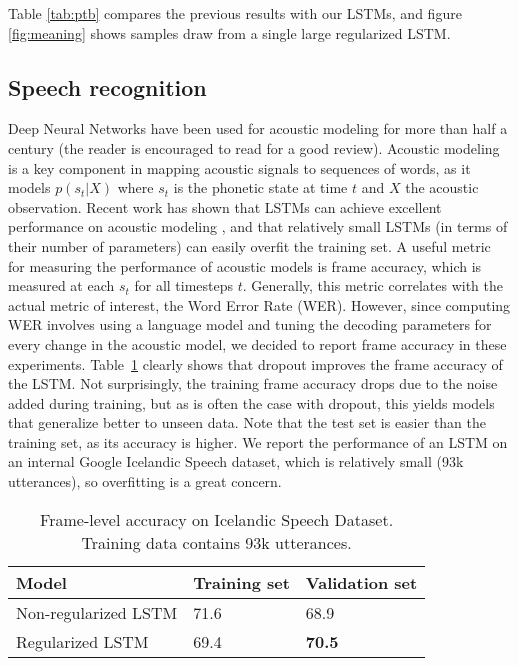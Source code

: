 \documentclass{article}
\begin{document}
Table \ref{tab:ptb} compares the previous results with our LSTMs, and
figure \ref{fig:meaning} shows samples draw from a single large 
regularized LSTM.



\subsection{Speech recognition}
\label{sec:speech}

Deep Neural Networks have been used for acoustic modeling for more
than half a century (the reader is encouraged to read
\citet{BourlardASR} for a good review). Acoustic modeling is a key
component in mapping acoustic signals to sequences of words, as it
models $p(s_t|X)$ where $s_t$ is the phonetic state at time $t$ and $X$
the acoustic observation. Recent work has shown that LSTMs can 
achieve excellent performance on acoustic modeling \cite{sak2014speech}, and that
relatively small LSTMs (in terms of their number of parameters) can
easily overfit the training set. A useful metric for measuring the performance of acoustic models is frame
accuracy, which is measured at each $s_t$ for all timesteps
$t$. Generally, this metric correlates with the actual metric of
interest, the Word Error Rate (WER). However, since computing WER
involves using a language model and tuning the decoding parameters for
every change in the acoustic model, we decided to report frame
accuracy in these experiments. Table~\ref{tab:speech} clearly shows
that dropout improves the frame accuracy of the LSTM. Not
surprisingly, the training frame accuracy drops due to the noise added
during training, but as is often the case with dropout, this yields
models that generalize better to unseen data. Note that the test
set is easier than the training set, as its accuracy is higher.  We
report the performance of an LSTM on an internal Google Icelandic
Speech dataset, which is relatively small (93k utterances), so
overfitting is a great concern.

\begin{table}[t]
  \small
  \centering
  \renewcommand{\arraystretch}{1.15}
  \begin{tabular}{lll}
    \hline
     Model & Training set & Validation set \\
    \hline
    Non-regularized LSTM & 71.6 & 68.9 \\
    Regularized LSTM & 69.4 & {\bf 70.5} \\
    \hline
  \end{tabular}
  \caption{Frame-level accuracy on Icelandic Speech Dataset. Training data contains 93k utterances.}
  \label{tab:speech}
\end{table}
\end{document}
